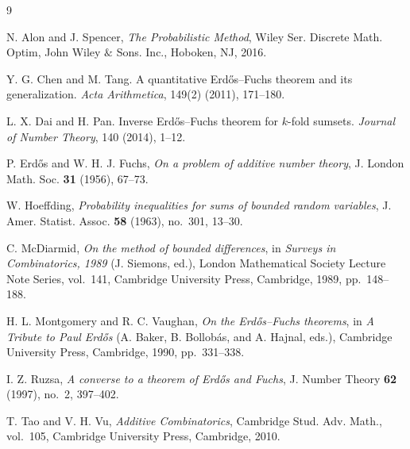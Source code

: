 \documentclass[12pt,reqno]{amsart}
\theoremstyle{plain}
\theoremstyle{definition}
\begin{document}
\begin{thebibliography}{9}


N. Alon and J. Spencer,
\emph{The Probabilistic Method}, Wiley Ser. Discrete Math. Optim, John Wiley $\&$ Sons. Inc., Hoboken, NJ, 2016.

Y. G. Chen and M. Tang.
A quantitative Erd\H{o}s--Fuchs theorem and its generalization.
\emph{Acta Arithmetica}, 149(2) (2011), 171--180.

L. X. Dai and H. Pan.
Inverse Erd\H{o}s--Fuchs theorem for $k$-fold sumsets.
\emph{Journal of Number Theory}, 140 (2014), 1--12.

P. Erd\H{o}s and W. H. J. Fuchs,
\emph{On a problem of additive number theory},
J. London Math. Soc. \textbf{31} (1956), 67--73.

W. Hoeffding,
\emph{Probability inequalities for sums of bounded random variables},
J. Amer. Statist. Assoc. \textbf{58} (1963), no.~301, 13--30.

C. McDiarmid,
\emph{On the method of bounded differences},
in \emph{Surveys in Combinatorics, 1989}
(J. Siemons, ed.), London Mathematical Society Lecture Note Series,
vol.~141, Cambridge University Press, Cambridge, 1989, pp.~148--188.

H. L. Montgomery and R. C. Vaughan,
\emph{On the Erd\H{o}s--Fuchs theorems},
in \emph{A Tribute to Paul Erd\H{o}s}
(A. Baker, B. Bollob\'as, and A. Hajnal, eds.),
Cambridge University Press, Cambridge, 1990, pp.~331--338.

I. Z. Ruzsa,
\emph{A converse to a theorem of Erd\H{o}s and Fuchs},
J. Number Theory \textbf{62} (1997), no.~2, 397--402.

T. Tao and V. H. Vu,
\emph{Additive Combinatorics},
Cambridge Stud. Adv. Math., vol.~105,
Cambridge University Press, Cambridge, 2010.

\end{thebibliography}
\end{document}

